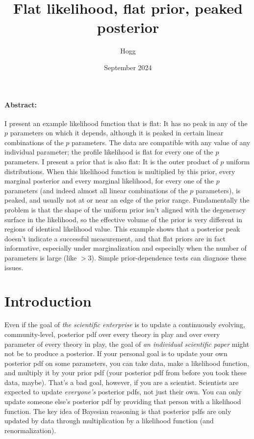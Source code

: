 \documentclass[10pt]{article}
\title{\bfseries Flat likelihood, flat prior, peaked posterior}
\author{Hogg}
\date{September 2024}
\begin{document}
\maketitle

\paragraph{Abstract:}
I present an example likelihood function that is flat:
It has no peak in any of the $p$ parameters on which it depends, although it is peaked in certain linear combinations of the $p$ parameters.
The data are compatible with any value of any individual parameter; the profile likelihood is flat for every one of the $p$ parameters.
I present a prior that is also flat:
It is the outer product of $p$ uniform distributions.
When this likelihood function is multiplied by this prior, every marginal posterior and every marginal likelihood, for every one of the $p$ parameters (and indeed almost all linear combinations of the $p$ parameters), is peaked, and usually not at or near an edge of the prior range.
Fundamentally the problem is that the shape of the uniform prior isn't aligned with the degeneracy surface in the likelihood, so the effective volume of the prior is very different in regions of identical likelihood value.
This example shows that a posterior peak doesn't indicate a successful measurement, and that flat priors are in fact informative, especially under marginalization and especially when the number of parameters is large (like $>3$).
Simple prior-dependence tests can diagnose these issues.

\section{Introduction}
Even if the goal of \emph{the scientific enterprise} is to update a continuously evolving, community-level, posterior pdf over every theory in play and over every parameter of every theory in play, the goal of \emph{an individual scientific paper} might not be to produce a posterior.
If your personal goal is to update your own posterior pdf on some parameters, you can take data, make a likelihood function, and multiply it by your prior pdf (your posterior pdf from before you took these data, maybe).
That's a bad goal, however, if you are a scientist.
Scientists are expected to update \emph{everyone's} posterior pdfs, not just their own.
You can only update someone else's posterior pdf by providing that person with a likelihood function.
The key idea of Bayesian reasoning is that posterior pdfs are only updated by data through multiplication by a likelihood function (and renormalization).
\end{document}
